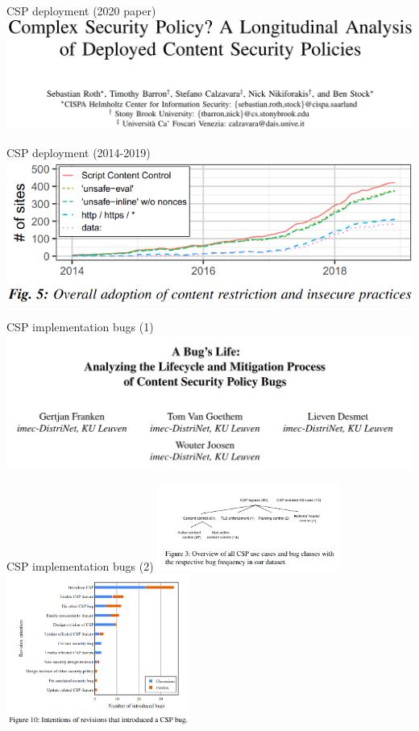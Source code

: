 \begin{frame}{CSP deployment (2020 paper)}
\includegraphics[height=0.85\textheight]{../web/roth-ndss-title}
\end{frame}

\begin{frame}{CSP deployment (2014-2019)}
\includegraphics[height=0.85\textheight]{../web/roth-ndss-fig5}
\end{frame}

\begin{frame}{CSP implementation bugs (1)}
\includegraphics[height=0.9\textheight]{../web/franken-title}
\end{frame}

\begin{frame}{CSP implementation bugs (2)}
\includegraphics[width=0.45\textwidth]{../web/franken-fig3}
\includegraphics[width=0.45\textwidth]{../web/franken-fig10}
\end{frame}
